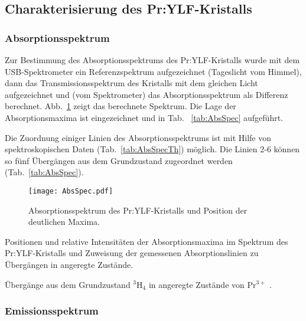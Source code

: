 \subsection{Charakterisierung des Pr:YLF-Kristalls}

\subsubsection{Absorptionsspektrum}

Zur Bestimmung des Absorptionsspektrums des Pr:YLF-Kristalls wurde mit dem USB-Spektrometer ein
Referenzspektrum aufgezeichnet (Tageslicht vom Himmel), dann das Transmissionsspektrum des Kristalls
mit dem gleichen Licht aufgezeichnet und (vom Spektrometer) das Absorptionsspektrum als Differenz
berechnet.
Abb.~\ref{img:AbsSpec} zeigt das berechnete Spektrum.
Die Lage der Absorptionsmaxima ist eingezeichnet und in Tab.~ \ref{tab:AbsSpec} aufgeführt.

Die Zuordnung einiger Linien des Absorptionsspektrums ist mit Hilfe von spektroskopischen Daten
(Tab.~\ref{tab:AbsSpecTh}) möglich.
Die Linien 2-6 können so fünf Übergängen aus dem Grundzustand zugeordnet werden
(Tab.~\ref{tab:AbsSpec}).

\begin{figure}[H]
\begin{center}
  \texttt{[image: AbsSpec.pdf]}
  \caption{Absorptionsspektrum des Pr:YLF-Kristalls und Position der deutlichen Maxima.}
  \label{img:AbsSpec}
\end{center}
\end{figure}

\begin{table}[htb]
\caption{Positionen und relative Intensitäten der Absorptionsmaxima im Spektrum des
Pr:YLF-Kristalls und Zuweisung der gemessenen Absorptionslinien zu Übergängen in angeregte
Zustände.}

\label{tab:AbsSpec}
\end{table}

\begin{table}[htb]
\caption{Übergänge aus dem Grundzustand $^3$H$_4$ in angeregte Zustände von Pr$^{3+}$
\cite{NIST_ASD}.}

\label{tab:AbsSpecTh}
\end{table}

\subsubsection{Emissionsspektrum}

